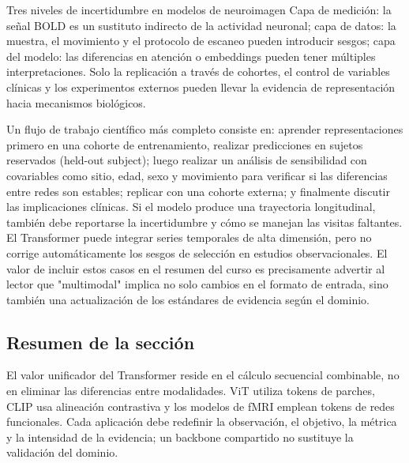 \documentclass[a4paper]{article}
\begin{document}

\begin{warningbox}{Tres niveles de incertidumbre en modelos de neuroimagen}
Capa de medición: la señal BOLD es un sustituto indirecto de la actividad neuronal; capa de datos: la muestra, el movimiento y el protocolo de escaneo pueden introducir sesgos; capa del modelo: las diferencias en atención o embeddings pueden tener múltiples interpretaciones. Solo la replicación a través de cohortes, el control de variables clínicas y los experimentos externos pueden llevar la evidencia de representación hacia mecanismos biológicos.
\end{warningbox}

Un flujo de trabajo científico más completo consiste en: aprender representaciones primero en una cohorte de entrenamiento, realizar predicciones en sujetos reservados (held-out subject); luego realizar un análisis de sensibilidad con covariables como sitio, edad, sexo y movimiento para verificar si las diferencias entre redes son estables; replicar con una cohorte externa; y finalmente discutir las implicaciones clínicas. Si el modelo produce una trayectoria longitudinal, también debe reportarse la incertidumbre y cómo se manejan las visitas faltantes. El Transformer puede integrar series temporales de alta dimensión, pero no corrige automáticamente los sesgos de selección en estudios observacionales. El valor de incluir estos casos en el resumen del curso es precisamente advertir al lector que "multimodal" implica no solo cambios en el formato de entrada, sino también una actualización de los estándares de evidencia según el dominio.

\subsection{Resumen de la sección}

El valor unificador del Transformer reside en el cálculo secuencial combinable, no en eliminar las diferencias entre modalidades. ViT utiliza tokens de parches, CLIP usa alineación contrastiva y los modelos de fMRI emplean tokens de redes funcionales. Cada aplicación debe redefinir la observación, el objetivo, la métrica y la intensidad de la evidencia; un backbone compartido no sustituye la validación del dominio.
\end{document}
